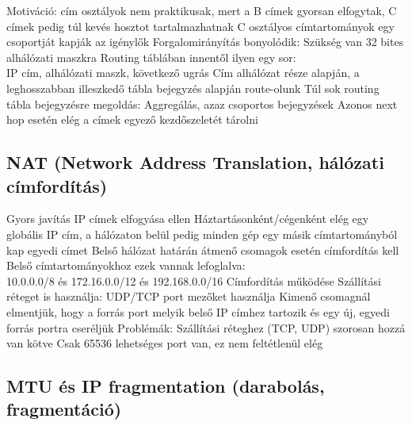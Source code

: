 \documentclass[12pt,a4paper]{article}
\begin{document}
\begin{outline}
	\1 Motiváció: cím osztályok nem praktikusak, mert a B címek gyorsan elfogytak, C címek pedig túl kevés hosztot tartalmazhatnak
	\1 C osztályos címtartományok egy csoportját kapják az igénylők
	\1 Forgalomirányítás bonyolódik:
		\2 Szükség van 32 bites alhálózati maszkra
		\2 Routing táblában innentől ilyen egy sor:\\
		IP cím, alhálózati maszk, következő ugrás
		\2 Cím alhálózat része alapján, a leghosszabban illeszkedő tábla bejegyzés alapján route-olunk
	\1 Túl sok routing tábla bejegyzésre megoldás:
		\2 Aggregálás, azaz csoportos bejegyzések
		\2 Azonos next hop esetén elég a címek egyező kezdőszeletét tárolni
\end{outline}

\subsection{NAT (Network Address Translation, hálózati címfordítás)}

\begin{outline}
	\1 Gyors javítás IP címek elfogyása ellen
	\1 Háztartásonként/cégenként elég egy globális IP cím, a hálózaton belül pedig minden gép egy másik címtartományból kap egyedi címet
		\2 Belső hálózat határán átmenő csomagok esetén címfordítás kell
		\2 Belső címtartományokhoz ezek vannak lefoglalva:\\
		10.0.0.0/8 és 172.16.0.0/12 és 192.168.0.0/16
	\1 Címfordítás működése
		\2 Szállítási réteget is használja: UDP/TCP port mezőket használja
		\2 Kimenő csomagnál elmentjük, hogy a forrás port melyik belső IP címhez tartozik és egy új, egyedi forrás portra cseréljük
	\1 Problémák:
		\2 Szállítási réteghez (TCP, UDP) szorosan hozzá van kötve
		\2 Csak 65536 lehetséges port van, ez nem feltétlenül elég
\end{outline}

\pagebreak

\subsection{MTU és IP fragmentation (darabolás, fragmentáció)}
\end{document}
